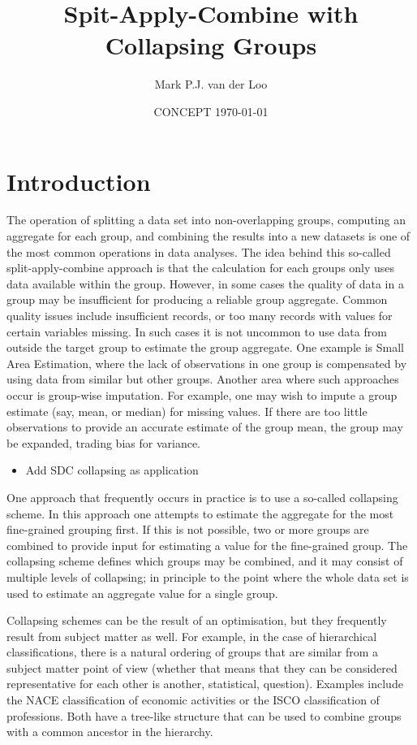 \documentclass[11pt, fleqn]{article}
\title{Spit-Apply-Combine with Collapsing Groups}
\author{Mark P.J. van der Loo}
\date{CONCEPT \today{}}
\begin{document}
\maketitle

\section{Introduction}
The operation of splitting a data set into non-overlapping groups, computing an
aggregate for each group, and combining the results into a new datasets is one
of the most common operations in data analyses. The idea behind this so-called
split-apply-combine approach is that the calculation for each groups only uses
data available within the group. However, in some cases the quality of data in
a group may be insufficient for producing a reliable group aggregate. Common
quality issues include insufficient records, or too many records with values
for certain variables missing. In such cases it is not uncommon to use data
from outside the target group  to estimate the group aggregate. One example is
Small Area Estimation, where the lack of observations in one group is
compensated by using data from similar but other groups. Another area where
such approaches occur is group-wise imputation. For example, one may wish to
impute a group estimate (say, mean, or median) for missing values. If there are
too little observations to provide an accurate estimate of the group mean, the
group may be expanded, trading bias for variance.

\begin{itemize}
\item Add SDC collapsing as application
\end{itemize}

One approach that frequently occurs in practice is to use a so-called
collapsing scheme. In this approach one attempts to estimate the aggregate for
the most fine-grained grouping first.  If this is not possible, two or more
groups are combined to provide input for estimating a value for the
fine-grained group. The collapsing scheme defines which groups may be combined,
and it may consist of multiple levels of collapsing; in principle to the point
where the whole data set is used to estimate an aggregate value for a single
group.

Collapsing schemes can be the result of an optimisation, but they frequently
result from subject matter as well. For example, in the case of hierarchical
classifications, there is a natural ordering of groups that are similar from a
subject matter point of view (whether that means that they can be considered
representative for each other is another, statistical, question).  Examples
include the NACE classification of economic activities or the ISCO
classification of professions. Both have a tree-like structure that can be used
to combine groups with a common ancestor in the hierarchy.
\end{document}
